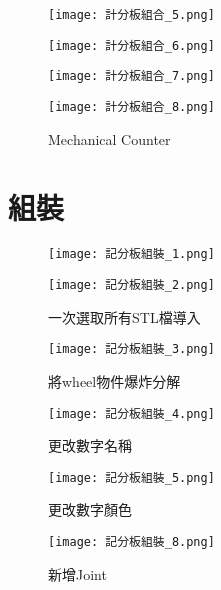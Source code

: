 \begin{figure}[hbt!]
  \centering
  \texttt{[image: 計分板組合\_5.png]}
\end{figure}
\begin{figure}[hbt!]
  \centering
  \texttt{[image: 計分板組合\_6.png]}
\end{figure}
\begin{figure}[hbt!]
  \centering
  \texttt{[image: 計分板組合\_7.png]}
\end{figure}
\begin{figure}[hbt!]
  \centering
  \texttt{[image: 計分板組合\_8.png]}
  \caption{Mechanical Counter}
  \label{fig:photo12}
\end{figure}

\section{組裝}
\begin{figure}[hbt!]
  \centering
  \texttt{[image: 記分板組裝\_1.png]}
\end{figure}
\begin{figure}[hbt!]
  \centering
  \texttt{[image: 記分板組裝\_2.png]}
  \caption{一次選取所有STL檔導入}
  \label{fig:photo13}
\end{figure}

\begin{figure}[hbt!]
  \begin{center}
    \texttt{[image: 記分板組裝\_3.png]}
  \end{center}
  \caption{將wheel物件爆炸分解}
  \label{fig:photo}
\end{figure}

\begin{figure}[hbt!]
  \begin{center}
    \texttt{[image: 記分板組裝\_4.png]}
  \end{center}
  \caption{更改數字名稱}
  \label{fig:photo}
\end{figure}

\begin{figure}[hbt!]
  \begin{center}
    \texttt{[image: 記分板組裝\_5.png]}
  \end{center}
  \caption{更改數字顏色}
  \label{fig:photo}
\end{figure}

\begin{figure}[hbt!]
  \begin{center}
    \texttt{[image: 記分板組裝\_8.png]}
  \end{center}
  \caption{新增Joint}
  \label{fig:photo}
\end{figure}

